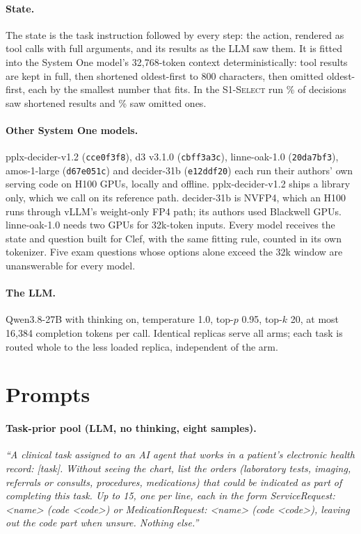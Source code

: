 \documentclass[11pt]{article}
\newcommand{\sel}{\textsc{S1-Select}}
\begin{document}
\paragraph{State.} The state is the task instruction followed by every step: the action, rendered as tool calls with
full arguments, and its results as the LLM saw them. It is fitted into the System One model's 32,768-token context
deterministically: tool results are kept in full, then shortened oldest-first to 800 characters, then omitted
oldest-first, each by the smallest number that fits. In the \sel{} run \DECSelshort\% of decisions saw shortened
results and \DECSelomit\% saw omitted ones.

\paragraph{Other System One models.} pplx-decider-v1.2 (\texttt{cce0f3f8}), d3 v3.1.0 (\texttt{cbff3a3c}),
linne-oak-1.0 (\texttt{20da7bf3}), amos-1-large (\texttt{d67e051c}) and decider-31b (\texttt{e12ddf20}) each run their
authors' own serving code on H100 GPUs, locally and offline. pplx-decider-v1.2 ships a library only, which we call on
its reference path. decider-31b is NVFP4, which an H100 runs through vLLM's weight-only FP4 path; its authors used
Blackwell GPUs. linne-oak-1.0 needs two GPUs for 32k-token inputs. Every model receives the state and question built
for Clef, with the same fitting rule, counted in its own tokenizer. Five exam questions whose options alone exceed the
32k window are unanswerable for every model.

\paragraph{The LLM.} Qwen3.8-27B with thinking on, temperature 1.0, top-$p$ 0.95, top-$k$ 20, at most 16,384 completion
tokens per call. Identical replicas serve all arms; each task is routed whole to the less loaded replica, independent
of the arm.

\FloatBarrier
\section{Prompts}\label{app:prompts}

\paragraph{Task-prior pool (LLM, no thinking, eight samples).} \emph{``A clinical task assigned to an AI agent that
works in a patient's electronic health record: [task]. Without seeing the chart, list the orders (laboratory tests,
imaging, referrals or consults, procedures, medications) that could be indicated as part of completing this task. Up
to 15, one per line, each in the form ServiceRequest: <name> (code <code>) or MedicationRequest: <name> (code <code>),
leaving out the code part when unsure. Nothing else.''}
\end{document}
